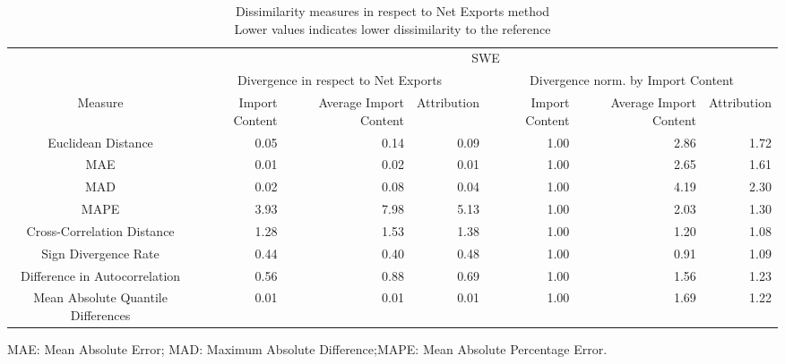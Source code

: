 \begin{table}[t]
\caption*{
{\large Dissimilarity measures in respect to Net Exports method} \\ 
{\small Lower values indicates lower dissimilarity to the reference}
} 
\fontsize{15.0pt}{18.0pt}\selectfont
\begin{tabular*}{\linewidth}{@{\extracolsep{\fill}}crrrrrr}
\toprule
 & \multicolumn{6}{c}{SWE} \\ 
\cmidrule(lr){2-7}
 & \multicolumn{3}{c}{Divergence in respect to Net Exports} & \multicolumn{3}{c}{Divergence norm. by Import Content} \\ 
\cmidrule(lr){2-4} \cmidrule(lr){5-7}
Measure & Import Content & Average Import Content & Attribution & Import Content & Average Import Content & Attribution \\ 
\midrule\addlinespace[2.5pt]
Euclidean Distance & 0.05 & 0.14 & 0.09 & 1.00 & 2.86 & 1.72 \\ 
MAE & 0.01 & 0.02 & 0.01 & 1.00 & 2.65 & 1.61 \\ 
MAD & 0.02 & 0.08 & 0.04 & 1.00 & 4.19 & 2.30 \\ 
MAPE & 3.93 & 7.98 & 5.13 & 1.00 & 2.03 & 1.30 \\ 
Cross-Correlation Distance & 1.28 & 1.53 & 1.38 & 1.00 & 1.20 & 1.08 \\ 
Sign Divergence Rate & 0.44 & 0.40 & 0.48 & 1.00 & 0.91 & 1.09 \\ 
Difference in Autocorrelation & 0.56 & 0.88 & 0.69 & 1.00 & 1.56 & 1.23 \\ 
Mean Absolute Quantile Differences & 0.01 & 0.01 & 0.01 & 1.00 & 1.69 & 1.22 \\ 
\bottomrule
\end{tabular*}
\begin{minipage}{\linewidth}
MAE: Mean Absolute Error; MAD: Maximum Absolute Difference;MAPE: Mean Absolute Percentage Error.\\
\end{minipage}
\end{table}

